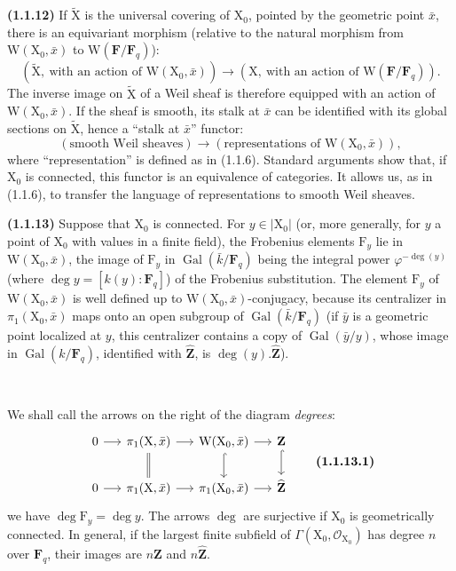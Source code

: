 \documentclass[11pt,leqno]{article}
\newcommand{\Page}[1]{\ifvmode\noindent\else\unskip\ \fi{\footnotesize\textcolor{gray}{[p.\,#1]}}\ \ignorespaces}
\begin{document}
\textbf{(1.1.12)} If \(\widetilde{\mathrm{X}}\) is the universal covering of \(\mathrm{X}_0\), pointed by the geometric point \(\bar x\), there is an equivariant morphism (relative to the natural morphism from \(\mathrm{W}(\mathrm{X}_0,\bar x)\) to \(\mathrm{W}(\mathbf{F}/\mathbf{F}_q)\)):
\[
(\widetilde{\mathrm{X}},\ \text{with an action of }\mathrm{W}(\mathrm{X}_0,\bar x))
\to
(\mathrm{X},\ \text{with an action of }\mathrm{W}(\mathbf{F}/\mathbf{F}_q)).
\]
The inverse image on \(\widetilde{\mathrm{X}}\) of a Weil sheaf is therefore equipped with an action of \(\mathrm{W}(\mathrm{X}_0,\bar x)\). If the sheaf is smooth, its stalk at \(\bar x\) can be identified with its global sections on \(\widetilde{\mathrm{X}}\), hence a “stalk at \(\bar x\)” functor:
\[
(\text{smooth Weil sheaves})
\to
(\text{representations of }\mathrm{W}(\mathrm{X}_0,\bar x)),
\]
where “representation” is defined as in (1.1.6). Standard arguments show that, if \(\mathrm{X}_0\) is connected, this functor is an equivalence of categories. It allows us, as in (1.1.6), to transfer the language of representations to smooth Weil sheaves.

\textbf{(1.1.13)} Suppose that \(\mathrm{X}_0\) is connected. For \(y\in|\mathrm{X}_0|\) (or, more generally, for \(y\) a point of \(\mathrm{X}_0\) with values in a finite field), the Frobenius elements \(\mathrm{F}_y\) lie in \(\mathrm{W}(\mathrm{X}_0,\bar x)\), the image of \(\mathrm{F}_y\) in \(\operatorname{Gal}(\bar k/\mathbf{F}_q)\) being the integral power \(\varphi^{-\deg(y)}\) (where \(\deg y=[k(y):\mathbf{F}_q]\)) of the Frobenius substitution. The element \(\mathrm{F}_y\) of \(\mathrm{W}(\mathrm{X}_0,\bar x)\) is well defined up to \(\mathrm{W}(\mathrm{X}_0,\bar x)\)-conjugacy, because its centralizer in \(\pi_1(\mathrm{X}_0,\bar x)\) maps onto an open subgroup of \(\operatorname{Gal}(\bar k/\mathbf{F}_q)\) (if \(\bar y\) is a geometric point localized at \(y\), this centralizer contains a copy of \(\operatorname{Gal}(\bar y/y)\), whose image in \(\operatorname{Gal}(k/\mathbf{F}_q)\), identified with \(\widehat{\mathbf{Z}}\), is \(\deg(y).\widehat{\mathbf{Z}}\)).

\Page{153}

We shall call the arrows on the right of the diagram \textit{degrees}:
\[
\begin{tikzcd}[column sep=1.4em,row sep=1.8em]
0 \arrow[r]
  & \pi_1(\mathrm{X},\bar{x}) \arrow[r] \arrow[d,equal]
  & \mathrm{W}(\mathrm{X}_0,\bar{x}) \arrow[r] \arrow[d,hook]
  & \mathbf{Z} \arrow[d,hook] \\
0 \arrow[r]
  & \pi_1(\mathrm{X},\bar{x}) \arrow[r]
  & \pi_1(\mathrm{X}_0,\bar{x}) \arrow[r]
  & \widehat{\mathbf{Z}}
\end{tikzcd}
\tag*{\textbf{(1.1.13.1)}}
\]
we have \(\deg \mathrm{F}_y=\deg y\). The arrows \(\deg\) are surjective if \(\mathrm{X}_0\) is geometrically connected. In general, if the largest finite subfield of \(\Gamma(\mathrm{X}_0,\mathscr{O}_{\mathrm{X}_0})\) has degree \(n\) over \(\mathbf{F}_q\), their images are \(n\mathbf{Z}\) and \(n\widehat{\mathbf{Z}}\).
\end{document}
